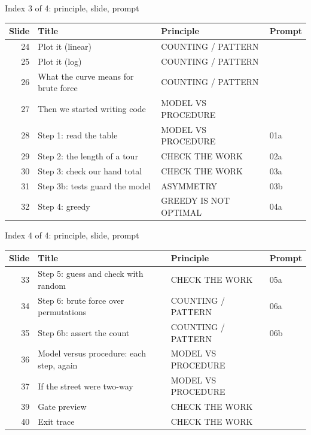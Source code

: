\begin{frame}{Index 3 of 4: principle, slide, prompt}
\scriptsize
\begin{tabular}{@{}r>{\raggedright\arraybackslash}p{5.4cm}>{\raggedright\arraybackslash}p{4.6cm}p{1.2cm}@{}}
\textbf{Slide} & \textbf{Title} & \textbf{Principle} & \textbf{Prompt}\\\midrule
24 & Plot it (linear) & COUNTING / PATTERN & \\
25 & Plot it (log) & COUNTING / PATTERN & \\
26 & What the curve means for brute force & COUNTING / PATTERN & \\
27 & Then we started writing code & MODEL VS PROCEDURE & \\
28 & Step 1: read the table & MODEL VS PROCEDURE & 01a\\
29 & Step 2: the length of a tour & CHECK THE WORK & 02a\\
30 & Step 3: check our hand total & CHECK THE WORK & 03a\\
31 & Step 3b: tests guard the model & ASYMMETRY & 03b\\
32 & Step 4: greedy & GREEDY IS NOT OPTIMAL & 04a\\
\end{tabular}
\end{frame}
\begin{frame}{Index 4 of 4: principle, slide, prompt}
\scriptsize
\begin{tabular}{@{}r>{\raggedright\arraybackslash}p{5.4cm}>{\raggedright\arraybackslash}p{4.6cm}p{1.2cm}@{}}
\textbf{Slide} & \textbf{Title} & \textbf{Principle} & \textbf{Prompt}\\\midrule
33 & Step 5: guess and check with random & CHECK THE WORK & 05a\\
34 & Step 6: brute force over permutations & COUNTING / PATTERN & 06a\\
35 & Step 6b: assert the count & COUNTING / PATTERN & 06b\\
36 & Model versus procedure: each step, again & MODEL VS PROCEDURE & \\
37 & If the street were two-way & MODEL VS PROCEDURE & \\
39 & Gate preview & CHECK THE WORK & \\
40 & Exit trace & CHECK THE WORK & \\
\end{tabular}
\end{frame}
